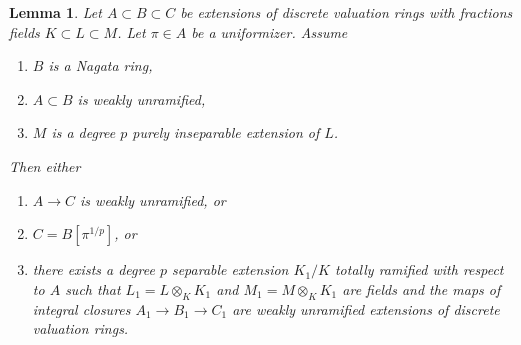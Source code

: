 \documentclass[10pt,a4paper]{amsart}
\theoremstyle{plain}
\newtheorem{lemma}[subsection]{Lemma}
\theoremstyle{definition}
\theoremstyle{remark}
\numberwithin{equation}{subsection}
\begin{document}
\begin{lemma}
\label{lemma-purely-inseparable-case}
Let $A \subset B \subset C$ be extensions of discrete valuation rings
with fractions fields $K \subset L \subset M$. Let $\pi \in A$ be a
uniformizer. Assume
\begin{enumerate}
\item $B$ is a Nagata ring,
\item $A \subset B$ is weakly unramified,
\item $M$ is a degree $p$ purely inseparable extension of $L$.
\end{enumerate}
Then either
\begin{enumerate}
\item $A \to C$ is weakly unramified, or
\item $C = B[\pi^{1/p}]$, or
\item there exists a degree $p$ separable extension $K_1/K$
totally ramified with respect to $A$
such that $L_1 = L \otimes_K K_1$ and $M_1 = M \otimes_K K_1$
are fields and the maps of integral closures $A_1 \to B_1 \to C_1$
are weakly unramified extensions of discrete valuation rings.
\end{enumerate}
\end{lemma}
\end{document}
